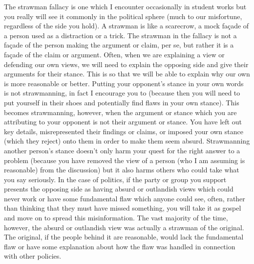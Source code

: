 The strawman fallacy is one which I encounter occasionally in student works but you really will see it commonly in the political sphere (much to our misfortune, regardless of the side you hold). A strawman is like a scarecrow, a mock façade of a person used as a distraction or a trick. The strawman in the fallacy is not a façade of the person making the argument or claim, per se, but rather it is a façade of the claim or argument. Often, when we are explaining a view or defending our own views, we will need to explain the opposing side and give their arguments for their stance. This is so that we will be able to explain why our own is more reasonable or better. Putting your opponent's stance in your own words is not strawmanning, in fact I encourage you to (because then you will need to put yourself in their shoes and potentially find flaws in your own stance). This becomes strawmanning, however, when the argument or stance which you are attributing to your opponent is not their argument or stance. You have left out key details, misrepresented their findings or claims, or imposed your own stance (which they reject) onto them in order to make them seem absurd. Strawmanning another person's stance doesn't only harm your quest for the right answer to a problem (because you have removed the view of a person (who I am assuming is reasonable) from the discussion) but it also harms others who could take what you say seriously. In the case of politics, if the party or group you support presents the opposing side as having absurd or outlandish views which could never work or have some fundamental flaw which anyone could see, often, rather than thinking that they must have missed something, you will take it as gospel and move on to spread this misinformation. The vast majority of the time, however, the absurd or outlandish view was actually a strawman of the original. The original, if the people behind it are reasonable, would lack the fundamental flaw or have some explanation about how the flaw was handled in connection with other policies. 

